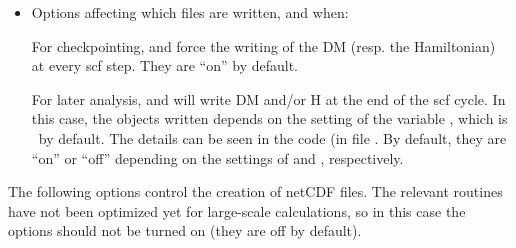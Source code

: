 \begin{itemize}
\item Options affecting which files are written, and when:
  
For checkpointing,   and   force the writing
of the DM (resp. the Hamiltonian) at every scf step. They are ``on''
by default.
  
For later analysis,  and
 will write DM and/or H at the end of the scf
cycle. In this case, the objects written depends on the setting of the
variable , which is \fdffalse\ by
default. The details can be seen in the
code (in file . By default, they are ``on'' or
``off'' depending on the settings of   and  ,
respectively.

\end{itemize}

The following options control the creation of netCDF files. The
relevant routines have not been optimized yet for large-scale
calculations, so in this case the options should not be turned on
(they are off by default).

